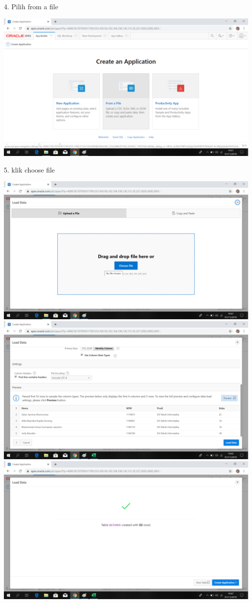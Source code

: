 \documentclass{article}
\begin{document}
\item 4. Pilih from a file 
\begin{center}
    \includegraphics[width=10cm\textwidth]{figure/4from.png}\\
\end{center}

\item 5. klik choose file
\begin{center}
    \includegraphics[width=10cm\textwidth]{figure/5choose.png}
    \includegraphics[width=10cm\textwidth]{figure/6load.png}
    \includegraphics[width=10cm\textwidth]{figure/7create.png}
\end{center}
\end{document}
